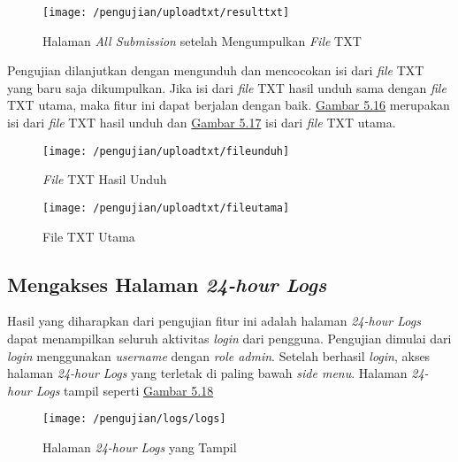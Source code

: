 	\begin{figure}[H]
		\centering  
		\texttt{[image: /pengujian/uploadtxt/resulttxt]}  
		\caption[Halaman \textit{All Submission} setelah Mengumpulkan \textit{File} TXT]{Halaman \textit{All Submission} setelah Mengumpulkan \textit{File} TXT} 
		\label{fig:resultttxt} 
	\end{figure}

	Pengujian dilanjutkan dengan mengunduh dan mencocokan isi dari \textit{file} TXT yang baru saja dikumpulkan. Jika isi dari \textit{file} TXT hasil unduh sama dengan \textit{file} TXT utama, maka fitur ini dapat berjalan dengan baik. \hyperref[fig:fileunduh]{Gambar 5.16} merupakan isi dari \textit{file} TXT hasil unduh dan \hyperref[fig:fileutama]{Gambar 5.17} isi dari \textit{file} TXT utama.
	
	\begin{figure}[H]
		\centering  
		\texttt{[image: /pengujian/uploadtxt/fileunduh]}  
		\caption[\textit{File} TXT Hasil Unduh]{\textit{File} TXT Hasil Unduh} 
		\label{fig:fileunduh} 
	\end{figure}
	
	\begin{figure}[H]
		\centering  
		\texttt{[image: /pengujian/uploadtxt/fileutama]}  
		\caption[File TXT Utama]{File TXT Utama} 
		\label{fig:fileutama} 
	\end{figure}

	\subsection{Mengakses Halaman \textit{24-hour Logs}}
	Hasil yang diharapkan dari pengujian fitur ini adalah halaman \textit{24-hour Logs} dapat menampilkan seluruh aktivitas \textit{login} dari pengguna. Pengujian dimulai dari \textit{login} menggunakan \textit{username} dengan \textit{role admin}. Setelah berhasil \textit{login}, akses halaman \textit{24-hour Logs} yang terletak di paling bawah \textit{side menu}. Halaman \textit{24-hour Logs} tampil seperti \hyperref[fig:logs]{Gambar 5.18}
	\begin{figure}[H]
		\centering  
		\texttt{[image: /pengujian/logs/logs]}  
		\caption[Halaman \textit{24-hour Logs} yang Tampil]{Halaman \textit{24-hour Logs} yang Tampil} 
		\label{fig:logs} 
	\end{figure}


